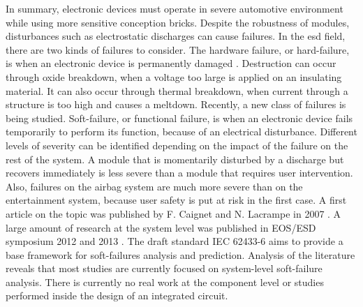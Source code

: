 In summary, electronic devices must operate in severe automotive environment while using more sensitive conception bricks.
Despite the robustness of modules, disturbances such as electrostatic discharges can cause failures.
In the \gls{esd} field, there are two kinds of failures to consider.
The hardware failure, or hard-failure, is when an electronic device is permanently damaged \cite{impactESDsemiconductors}.
Destruction can occur through oxide breakdown, when a voltage too large is applied on an insulating material.
It can also occur through thermal breakdown, when current through a structure is too high and causes a meltdown.
Recently, a new class of failures is being studied.
Soft-failure, or functional failure, is when an electronic device fails temporarily to perform its function, because of an electrical disturbance.
Different levels of severity can be identified depending on the impact of the failure on the rest of the system.
A module that is momentarily disturbed by a discharge but recovers immediately is less severe than a module that requires user intervention.
Also, failures on the airbag system are much more severe than on the entertainment system, because user safety is put at risk in the first case.
A first article on the topic was published by F. Caignet and N. Lacrampe in 2007 \cite{LacrampeTransientImmunity}.
A large amount of research at the system level was published in EOS/ESD symposium 2012 \cite{soft-error-esd-1,SDRAMCase,mixedModeESDSims} and 2013 \cite{softFailSubsystem, powered-tlp-soft-fail}.
The draft standard IEC 62433-6 \cite{iec62433-6} aims to provide a base framework for soft-failures analysis and prediction.
Analysis of the literature reveals that most studies are currently focused on system-level soft-failure analysis.
There is currently no real work at the component level or studies performed inside the design of an integrated circuit.

